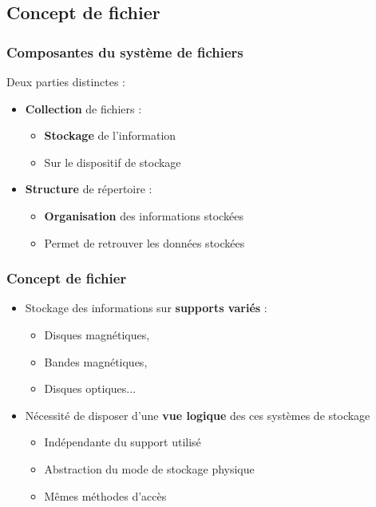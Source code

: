 \subsection{Concept de fichier}

\begin{frame}
\frametitle{Composantes du système de fichiers}
Deux parties distinctes :
\begin{itemize}
\item \textbf{Collection} de fichiers :
\begin{itemize}
\item \textbf{Stockage} de l'information
\item Sur le dispositif de stockage
\end{itemize}
\item \textbf{Structure} de répertoire :
\begin{itemize}
\item \textbf{Organisation} des informations stockées
\item Permet de retrouver les données stockées
\end{itemize}
\end{itemize}
\end{frame}


\begin{frame}
\frametitle{Concept de fichier}
\begin{itemize}
\item Stockage des informations sur \textbf{supports variés} :
\begin{itemize}
\item Disques magnétiques,
\item Bandes magnétiques,
\item Disques optiques...
\end{itemize}
\item Nécessité de disposer d'une \textbf{vue logique} des ces systèmes de stockage
\begin{itemize}
\item Indépendante du support utilisé
\item Abstraction du mode de stockage physique
\item Mêmes méthodes d'accès
\end{itemize}
\end{itemize}
\end{frame}

